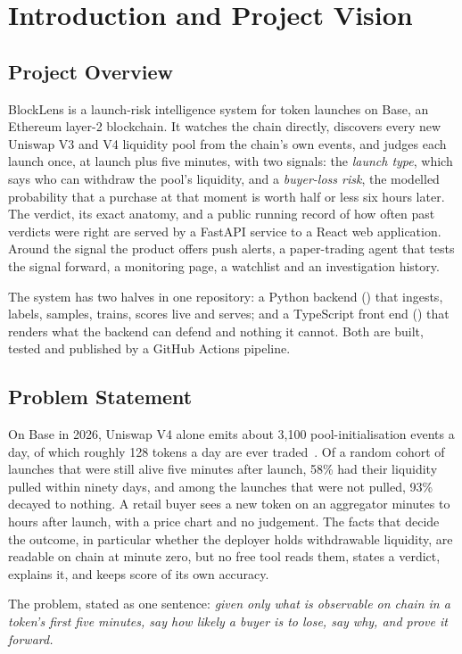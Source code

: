 \chapter{Introduction and Project Vision}

\section{Project Overview}
BlockLens is a launch-risk intelligence system for token launches on Base, an Ethereum layer-2 blockchain. It watches the chain directly, discovers every new Uniswap V3 and V4 liquidity pool from the chain's own events, and judges each launch once, at launch plus five minutes, with two signals: the \emph{launch type}, which says who can withdraw the pool's liquidity, and a \emph{buyer-loss risk}, the modelled probability that a purchase at that moment is worth half or less six hours later. The verdict, its exact anatomy, and a public running record of how often past verdicts were right are served by a FastAPI service to a React web application. Around the signal the product offers push alerts, a paper-trading agent that tests the signal forward, a monitoring page, a watchlist and an investigation history.

The system has two halves in one repository: a Python backend () that ingests, labels, samples, trains, scores live and serves; and a TypeScript front end () that renders what the backend can defend and nothing it cannot. Both are built, tested and published by a GitHub Actions pipeline.

\section{Problem Statement}
On Base in 2026, Uniswap V4 alone emits about 3,100 pool-initialisation events a day, of which roughly 128 tokens a day are ever traded~\cite{decisions}. Of a random cohort of launches that were still alive five minutes after launch, 58\% had their liquidity pulled within ninety days, and among the launches that were not pulled, 93\% decayed to nothing. A retail buyer sees a new token on an aggregator minutes to hours after launch, with a price chart and no judgement. The facts that decide the outcome, in particular whether the deployer holds withdrawable liquidity, are readable on chain at minute zero, but no free tool reads them, states a verdict, explains it, and keeps score of its own accuracy.

The problem, stated as one sentence: \emph{given only what is observable on chain in a token's first five minutes, say how likely a buyer is to lose, say why, and prove it forward.}

